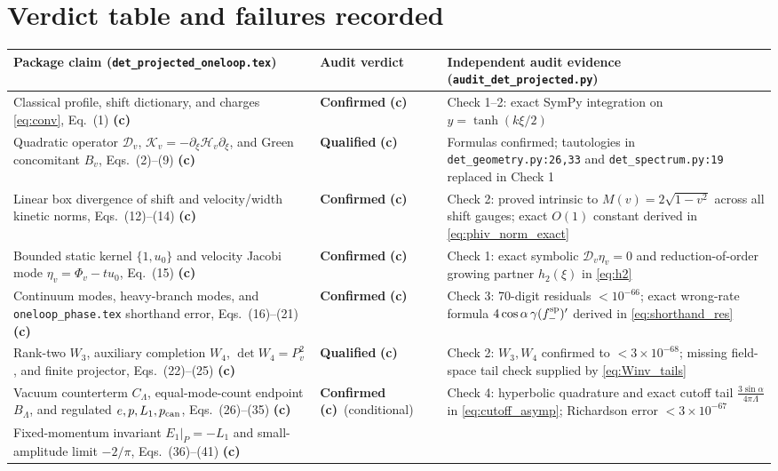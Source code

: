 \documentclass[11pt,a4paper]{article}
\newcommand{\Lc}{\textsf{\textbf{(c)}}\ }
\newcommand{\scr}{\texttt{audit\_\allowbreak det\_\allowbreak projected.py}}
\begin{document}
\section{Verdict table and failures recorded}
\begin{center}\small
\begin{longtable}{@{}L{5.6cm}L{2.8cm}L{5.8cm}@{}}
\toprule
Package claim (\texttt{det\_projected\_oneloop.tex}) & Audit verdict & Independent audit evidence (\scr)\\\midrule
\endhead
Classical profile, shift dictionary, and charges \eqref{eq:conv}, Eq.~(1) \Lc
 & \textbf{Confirmed} \Lc & Check 1--2: exact SymPy integration on $y=\tanh(k\xi/2)$\\
Quadratic operator $\mathcal D_v$, $\mathcal K_v=-\partial_\xi\mathcal H_v\partial_\xi$, and Green concomitant $B_v$, Eqs.~(2)--(9) \Lc
 & \textbf{Qualified} \Lc & Formulas confirmed; tautologies in \texttt{det\_geometry.py:26,33} and \texttt{det\_spectrum.py:19} replaced in Check 1\\
Linear box divergence of shift and velocity/width kinetic norms, Eqs.~(12)--(14) \Lc
 & \textbf{Confirmed} \Lc & Check 2: proved intrinsic to $M(v)=2\sqrt{1-v^2}$ across all shift gauges; exact $O(1)$ constant derived in \eqref{eq:phiv_norm_exact}\\
Bounded static kernel $\{1,u_0\}$ and velocity Jacobi mode $\eta_v=\Phi_v-tu_0$, Eq.~(15) \Lc
 & \textbf{Confirmed} \Lc & Check 1: exact symbolic $\mathcal D_v\eta_v=0$ and reduction-of-order growing partner $h_2(\xi)$ in \eqref{eq:h2}\\
Continuum modes, heavy-branch modes, and \texttt{oneloop\_phase.tex} shorthand error, Eqs.~(16)--(21) \Lc
 & \textbf{Confirmed} \Lc & Check 3: 70-digit residuals $<10^{-66}$; exact wrong-rate formula $4\cos\alpha\,\gamma(f_-^{\rm sp})'$ derived in \eqref{eq:shorthand_res}\\
Rank-two $W_3$, auxiliary completion $W_4$, $\det W_4=P_v^2$, and finite projector, Eqs.~(22)--(25) \Lc
 & \textbf{Qualified} \Lc & Check 2: $W_3,W_4$ confirmed to $<3\times10^{-68}$; missing field-space tail check supplied by \eqref{eq:Winv_tails}\\
Vacuum counterterm $C_\Lambda$, equal-mode-count endpoint $B_\Lambda$, and regulated $e,p,L_1,p_{\rm can}$, Eqs.~(26)--(35) \Lc
 & \textbf{Confirmed} \Lc (conditional) & Check 4: hyperbolic quadrature and exact cutoff tail $\frac{3\sin\alpha}{4\pi\Lambda}$ in \eqref{eq:cutoff_asymp}; Richardson error $<3\times10^{-67}$\\
Fixed-momentum invariant $E_1|_P=-L_1$ and small-amplitude limit $-2/\pi$, Eqs.~(36)--(41) \Lc

\end{longtable}
\end{center}
\end{document}
